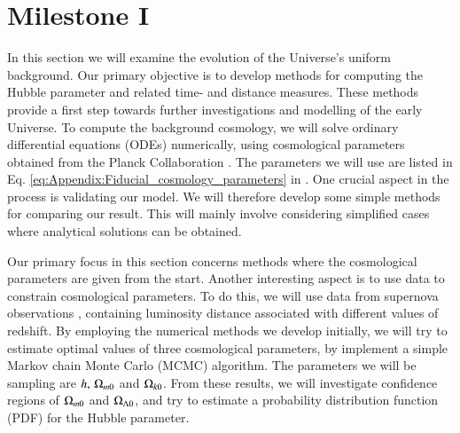 \section{Milestone I}\label{M1}
In this section we will examine the evolution of the Universe's uniform background. Our primary objective is to develop methods for computing the Hubble parameter and related time- and distance measures. These methods provide a first step towards further investigations and modelling of the early Universe. To compute the background cosmology, we will solve ordinary differential equations (ODEs) numerically, using cosmological parameters obtained from the Planck Collaboration \cite*{Planck2020}. The parameters we will use are listed in Eq. \eqref{eq:Appendix:Fiducial_cosmology_parameters} in  . One crucial aspect in the process is validating our model. We will therefore develop some simple methods for comparing our result. This will mainly involve considering simplified cases where analytical solutions can be obtained. 

Our primary focus in this section concerns methods where the cosmological parameters are given from the start. Another interesting aspect is to use data to constrain cosmological parameters. To do this, we will use data from supernova observations \cite{Supernova2014Betoule}, containing luminosity distance associated with different values of redshift. By employing the numerical methods we develop initially, we will try to estimate optimal values of three cosmological parameters, by implement a simple Markov chain Monte Carlo (MCMC) algorithm. The parameters we will be sampling are $h,\,\Omega_{m0}$ and $\Omega_{k0}$. From these results, we will investigate confidence regions of $\Omega_{m0}$ and $\Omega_{\Lambda 0}$, and try to estimate a probability distribution function (PDF) for the Hubble parameter. 






